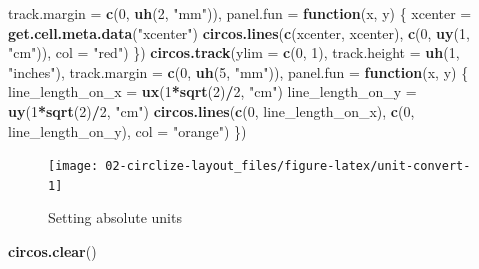\documentclass[]{book}
\newenvironment{Shaded}{\begin{snugshade}}{\end{snugshade}}
\newcommand{\KeywordTok}[1]{\textcolor[rgb]{0.13,0.29,0.53}{\textbf{#1}}}
\newcommand{\DataTypeTok}[1]{\textcolor[rgb]{0.13,0.29,0.53}{#1}}
\newcommand{\DecValTok}[1]{\textcolor[rgb]{0.00,0.00,0.81}{#1}}
\newcommand{\StringTok}[1]{\textcolor[rgb]{0.31,0.60,0.02}{#1}}
\newcommand{\ControlFlowTok}[1]{\textcolor[rgb]{0.13,0.29,0.53}{\textbf{#1}}}
\newcommand{\OperatorTok}[1]{\textcolor[rgb]{0.81,0.36,0.00}{\textbf{#1}}}
\newcommand{\NormalTok}[1]{#1}
\theoremstyle{definition}
\theoremstyle{definition}
\theoremstyle{remark}
\begin{document}
\begin{Shaded}
\begin{Highlighting}[]
    \DataTypeTok{track.margin =} \KeywordTok{c}\NormalTok{(}\DecValTok{0}\NormalTok{, }\KeywordTok{uh}\NormalTok{(}\DecValTok{2}\NormalTok{, }\StringTok{"mm"}\NormalTok{)),}
    \DataTypeTok{panel.fun =} \ControlFlowTok{function}\NormalTok{(x, y) \{}
\NormalTok{        xcenter =}\StringTok{ }\KeywordTok{get.cell.meta.data}\NormalTok{(}\StringTok{"xcenter"}\NormalTok{)}
        \KeywordTok{circos.lines}\NormalTok{(}\KeywordTok{c}\NormalTok{(xcenter, xcenter), }\KeywordTok{c}\NormalTok{(}\DecValTok{0}\NormalTok{, }\KeywordTok{uy}\NormalTok{(}\DecValTok{1}\NormalTok{, }\StringTok{"cm"}\NormalTok{)), }\DataTypeTok{col =} \StringTok{"red"}\NormalTok{)}
\NormalTok{    \})}
\KeywordTok{circos.track}\NormalTok{(}\DataTypeTok{ylim =} \KeywordTok{c}\NormalTok{(}\DecValTok{0}\NormalTok{, }\DecValTok{1}\NormalTok{), }\DataTypeTok{track.height =} \KeywordTok{uh}\NormalTok{(}\DecValTok{1}\NormalTok{, }\StringTok{"inches"}\NormalTok{),}
    \DataTypeTok{track.margin =} \KeywordTok{c}\NormalTok{(}\DecValTok{0}\NormalTok{, }\KeywordTok{uh}\NormalTok{(}\DecValTok{5}\NormalTok{, }\StringTok{"mm"}\NormalTok{)),}
    \DataTypeTok{panel.fun =} \ControlFlowTok{function}\NormalTok{(x, y) \{}
\NormalTok{        line_length_on_x =}\StringTok{ }\KeywordTok{ux}\NormalTok{(}\DecValTok{1}\OperatorTok{*}\KeywordTok{sqrt}\NormalTok{(}\DecValTok{2}\NormalTok{)}\OperatorTok{/}\DecValTok{2}\NormalTok{, }\StringTok{"cm"}\NormalTok{)}
\NormalTok{        line_length_on_y =}\StringTok{ }\KeywordTok{uy}\NormalTok{(}\DecValTok{1}\OperatorTok{*}\KeywordTok{sqrt}\NormalTok{(}\DecValTok{2}\NormalTok{)}\OperatorTok{/}\DecValTok{2}\NormalTok{, }\StringTok{"cm"}\NormalTok{)}
        \KeywordTok{circos.lines}\NormalTok{(}\KeywordTok{c}\NormalTok{(}\DecValTok{0}\NormalTok{, line_length_on_x), }\KeywordTok{c}\NormalTok{(}\DecValTok{0}\NormalTok{, line_length_on_y), }\DataTypeTok{col =} \StringTok{"orange"}\NormalTok{)}
\NormalTok{    \})}
\end{Highlighting}
\end{Shaded}

\begin{figure}

{\centering \texttt{[image: 02-circlize-layout\_files/figure-latex/unit-convert-1]} 

}

\caption{Setting absolute units}\label{fig:unit-convert}
\end{figure}

\begin{Shaded}
\begin{Highlighting}[]
\KeywordTok{circos.clear}\NormalTok{()}
\end{Highlighting}
\end{Shaded}
\end{document}
